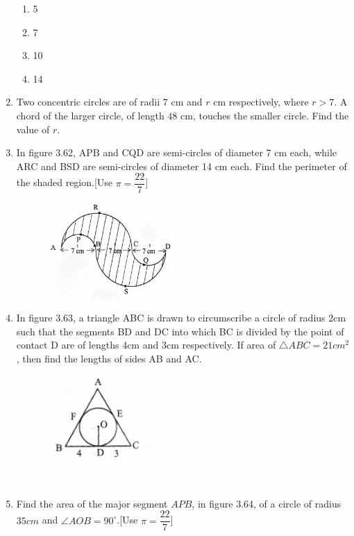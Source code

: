 \begin{enumerate}
    \begin{enumerate}
        \item 5
        \item 7 
        \item 10
        \item 14
    \end{enumerate}
    \item 	Two concentric circles are of radii $7$ cm and $r$ cm respectively, where $r>7$. A chord of the larger circle, of length $48$ cm, touches the smaller circle. Find the value of $r$.
    \item In figure 3.62, APB and CQD are semi-circles of diameter 7 cm each, while ARC and BSD are semi-circles of diameter 14 cm each. Find the perimeter of the shaded region.[Use $\pi=\dfrac{22}{7}$]
    \begin{figure}[h]
        \centering
        \includegraphics[width=5cm]{figs/circfig_3.jpg}
        \caption{}
    \end{figure}
    \item In figure 3.63, a triangle ABC is drawn to circumscribe a circle of radius 2cm such that the segments BD and DC into which BC is divided by the point of contact D are of lengths 4cm and 3cm respectively. If area of $\triangle ABC=21cm^2$, then find the lengths of sides AB and AC.
    \begin{figure}[h]
        \centering
        \includegraphics[width=4cm]{figs/circfig_4.jpg}
        \caption{}
    \end{figure}\\
    \item Find the area of the major segment $APB$, in figure 3.64, of a circle of radius $35cm$ and $\angle AOB=90^\circ$.[Use $\pi=\dfrac{22}{7}$]
     \begin{figure}[H]

\end{figure}
\end{enumerate}
